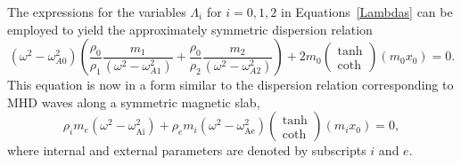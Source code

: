 The expressions for the variables $\Lambda_i$ for $i = 0,1,2$ in Equations~\eqref{Lambdas} can be employed to yield the approximately symmetric dispersion relation
\begin{equation}
(\omega^2 - \omega_{A0}^2)\left(\frac{\rho_0}{\rho_1}\frac{m_1}{(\omega^2 - \omega_{A1}^2)} + \frac{\rho_0}{\rho_2}\frac{m_2}{(\omega^2 - \omega_{A2}^2)}\right) + 2m_0\left(\begin{matrix}\tanh \\ \coth \end{matrix}\right)(m_0x_0) = 0. \label{DR approx}
\end{equation}
This equation is now in a form similar to the dispersion relation corresponding to MHD waves along a symmetric magnetic slab,
\begin{equation}
\rho_im_e(\omega^2 - \omega_\textrm{Ai}^2) + \rho_em_i(\omega^2 - \omega_\textrm{Ae}^2)\left(\begin{matrix}\tanh \\ \coth \end{matrix}\right)(m_ix_0) = 0, \label{DRsym}
\end{equation}
where internal and external parameters are denoted by subscripts $i$ and $e$.


